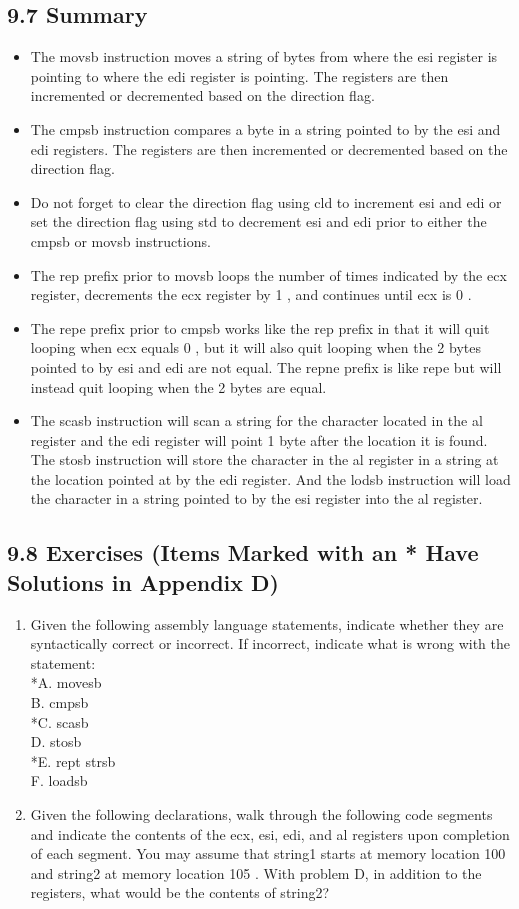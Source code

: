 \documentclass[10pt]{book}
\begin{document}
\subsection*{9.7 Summary}
\begin{itemize}
  \item The movsb instruction moves a string of bytes from where the esi register is pointing to where the edi register is pointing. The registers are then incremented or decremented based on the direction flag.
  \item The cmpsb instruction compares a byte in a string pointed to by the esi and edi registers. The registers are then incremented or decremented based on the direction flag.
  \item Do not forget to clear the direction flag using cld to increment esi and edi or set the direction flag using std to decrement esi and edi prior to either the cmpsb or movsb instructions.
  \item The rep prefix prior to movsb loops the number of times indicated by the ecx register, decrements the ecx register by 1 , and continues until ecx is 0 .
  \item The repe prefix prior to cmpsb works like the rep prefix in that it will quit looping when ecx equals 0 , but it will also quit looping when the 2 bytes pointed to by esi and edi are not equal. The repne prefix is like repe but will instead quit looping when the 2 bytes are equal.
  \item The scasb instruction will scan a string for the character located in the al register and the edi register will point 1 byte after the location it is found. The stosb instruction will store the character in the al register in a string at the location pointed at by the edi register. And the lodsb instruction will load the character in a string pointed to by the esi register into the al register.
\end{itemize}


\subsection*{9.8 Exercises (Items Marked with an * Have Solutions in Appendix D)}
\begin{enumerate}
  \item Given the following assembly language statements, indicate whether they are syntactically correct or incorrect. If incorrect, indicate what is wrong with the statement:\\
*A. movesb\\
B. cmpsb\\
*C. scasb\\
D. stosb\\
*E. rept strsb\\
F. loadsb
  \item Given the following declarations, walk through the following code segments and indicate the contents of the ecx, esi, edi, and al registers upon completion of each segment. You may assume that string1 starts at memory location 100 and string2 at memory location 105 . With problem D, in addition to the registers, what would be the contents of string2?
\end{enumerate}
\end{document}
